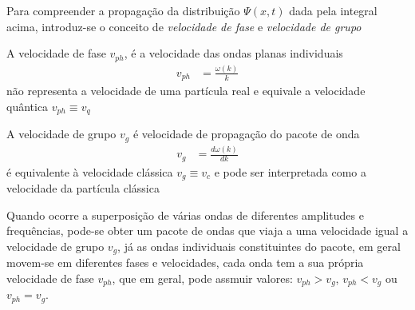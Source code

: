 \begin{prob}
\begin{sol}
Para compreender a propagação da distribuição $\Psi(x,t)$ dada pela integral acima, introduz-se o conceito de \textit{velocidade de fase} e \textit{velocidade de grupo}
\begin{definition}
	A velocidade de fase $v_{ph}$, é a velocidade das ondas planas individuais
	\begin{align}
		v_{ph} &= \frac{\omega(k)}{k}
	\end{align}
	não representa a velocidade de uma partícula real e equivale a velocidade quântica $v_{ph}\equiv v_{q}$
\end{definition}
\begin{definition}
	A velocidade de grupo $v_{g}$ é  velocidade de propagação do pacote de onda
	\begin{align}
		v_{g} &= \frac{d \omega(k)}{dk}
	\end{align}
	é equivalente à velocidade clássica $v_{g}\equiv v_{c}$ e pode ser interpretada como a velocidade da partícula clássica
\end{definition}
Quando ocorre a superposição de várias ondas de diferentes amplitudes e frequências, pode-se obter um pacote de ondas que viaja a uma velocidade igual a velocidade de grupo $v_{g}$, já as ondas individuais constituintes do pacote, em geral movem-se em diferentes fases e velocidades, cada onda tem a sua própria velocidade de fase $v_{ph}$, que em geral, pode assmuir valores: $v_{ph}>v_{g}$, $v_{ph}<v_{g}$ ou $v_{ph}=v_{g}$.

	\end{sol}
\end{prob}
